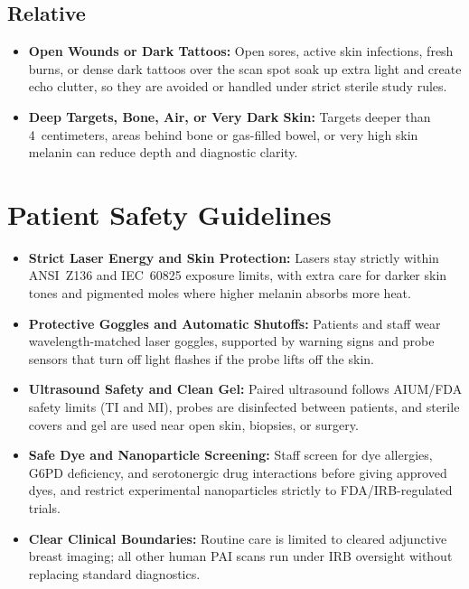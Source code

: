 \subsection{Relative}
\begin{itemize}
  \item \textbf{Open Wounds or Dark Tattoos:} Open sores, active skin infections, fresh burns, or dense dark tattoos over the scan spot soak up extra light and create echo clutter, so they are avoided or handled under strict sterile study rules.
  \item \textbf{Deep Targets, Bone, Air, or Very Dark Skin:} Targets deeper than 4~centimeters, areas behind bone or gas-filled bowel, or very high skin melanin can reduce depth and diagnostic clarity.
\end{itemize}

\section{Patient Safety Guidelines}
\begin{itemize}
  \item \textbf{Strict Laser Energy and Skin Protection:} Lasers stay strictly within ANSI~Z136 and IEC~60825 exposure limits, with extra care for darker skin tones and pigmented moles where higher melanin absorbs more heat.
  \item \textbf{Protective Goggles and Automatic Shutoffs:} Patients and staff wear wavelength-matched laser goggles, supported by warning signs and probe sensors that turn off light flashes if the probe lifts off the skin.
  \item \textbf{Ultrasound Safety and Clean Gel:} Paired ultrasound follows AIUM/FDA safety limits (TI and MI), probes are disinfected between patients, and sterile covers and gel are used near open skin, biopsies, or surgery.
  \item \textbf{Safe Dye and Nanoparticle Screening:} Staff screen for dye allergies, G6PD deficiency, and serotonergic drug interactions before giving approved dyes, and restrict experimental nanoparticles strictly to FDA/IRB-regulated trials.
  \item \textbf{Clear Clinical Boundaries:} Routine care is limited to cleared adjunctive breast imaging; all other human PAI scans run under IRB oversight without replacing standard diagnostics.
\end{itemize}

